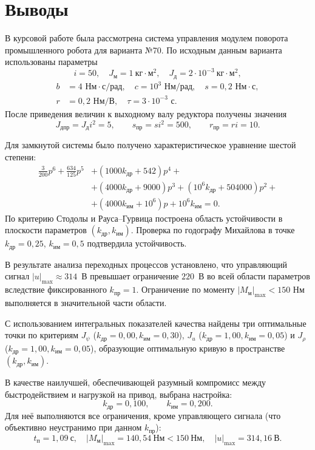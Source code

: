 \documentclass[a4paper, 14pt]{extarticle}
\begin{document}
\newpage
\section*{Выводы}
{}

В курсовой работе была рассмотрена система управления модулем поворота промышленного робота для варианта №70. По исходным данным варианта использованы параметры
\[
	i=50,\quad J_\text{м}=1~\text{кг}\cdot\text{м}^2,\quad
	J_\text{д}=2\cdot10^{-3}~\text{кг}\cdot\text{м}^2,
\]
\[
	\begin{aligned}
		b & = 4 \text{ Нм}\cdot\text{с/рад}, \quad
		c = 10^3 \text{ Нм/рад}, \quad
		s = 0{,}2 \text{ Нм}\cdot\text{с},         \\
		r & = 0{,}2 \text{ Нм/В}, \quad
		\tau = 3\cdot10^{-3} \text{ с}.
	\end{aligned}
\]
После приведения величин к выходному валу редуктора получены значения
\[
	J_{\text{дпр}}=J_\text{д}i^2=5,\qquad
	s_{\text{пр}}=si^2=500,\qquad
	r_{\text{пр}}=ri=10.
\]

Для замкнутой системы было получено характеристическое уравнение шестой степени:
\[
	\begin{split}
		\frac{3}{200}p^6 + \frac{634}{125}p^5 & + (1000k_\text{др}+542)p^4 +                                \\
		                                      & + (4000k_\text{др}+9000)p^3 + (10^6k_\text{др}+504000)p^2 + \\
		                                      & + (4000k_\text{им}+10^6)p + 10^6k_\text{им} = 0.
	\end{split}
\]
По критерию Стодолы и Рауса--Гурвица построена область устойчивости в плоскости параметров $(k_\text{др},k_\text{им})$. Проверка по годографу Михайлова в точке $k_\text{др}=0{,}25$, $k_\text{им}=0{,}5$ подтвердила устойчивость.

В результате анализа переходных процессов установлено, что управляющий сигнал $|u|_{\max}\approx314$~В превышает ограничение $220$~В во всей области параметров вследствие фиксированного $k_\text{пр}=1$. Ограничение по моменту $|M_\text{м}|_{\max}<150$ Нм выполняется в значительной части области.

С использованием интегральных показателей качества найдены три оптимальные точки по критериям $J_\psi$ ($k_{др}=0{,}00, k_{им}=0{,}30$), $J_u$ ($k_{др}=1{,}00, k_{им}=0{,}05$) и $J_\rho$ ($k_{др}=1{,}00, k_{им}=0{,}05$), образующие оптимальную кривую в пространстве $(k_\text{др},k_\text{им})$.

В качестве наилучшей, обеспечивающей разумный компромисс между быстродействием и нагрузкой на привод, выбрана настройка:
\[
	\boxed{k_\text{др}=0{,}100,\qquad k_\text{им}=0{,}200.}
\]
Для неё выполняются все ограничения, кроме управляющего сигнала (что объективно неустранимо при данном $k_\text{пр}$):
\[
	t_\text{п}=1{,}09~\text{с},\quad
	|M_\text{м}|_{\max}=140{,}54~\text{Нм}<150~\text{Нм},\quad
	|u|_{\max}=314{,}16~\text{В}.
\]
\end{document}
